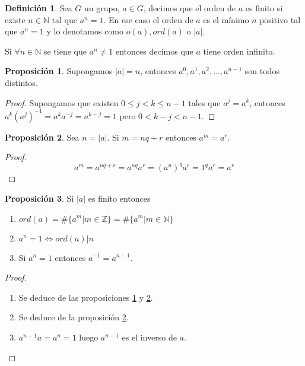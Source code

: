 \documentclass{article}
\theoremstyle{definition}
\newtheorem{defn}{Definici\'on}[subsection]
\newtheorem{prop}{Proposici\'on}[subsection]
\begin{document}
\begin{defn}
Sea $G$ un grupo, $a \in G$, decimos que el orden de $a$ es finito si existe $n \in \mathbb{N}$ tal que $a^n = 1$. En ese caso el orden de $a$ es el m\'inimo $n$ positivo tal que $a^n = 1$ y lo denotamos como $o(a), ord(a)$ o $|a|$.

Si $\forall n \in \mathbb{N}$ se tiene que $a^n \neq 1$ entonces decimos que $a$ tiene orden infinito.
\end{defn}

\begin{prop}
\label{p1}
Supongamos $|a| = n$, entonces $a^0, a^1, a^2, \dots, a^{n-1}$ son todos distintos.
\end{prop}

\begin{proof}
Supongamos que existen $0 \leq j < k \leq n-1$ tales que $a^j = a^k$, entonces $a^k (a^j)^{-1} = a^k a^{-j} = a^{k-j} = 1$ pero $0 < k-j < n-1$.
\end{proof}

\begin{prop}
\label{p2}
Sea $n = |a|$. Si $m = nq+r$ entonces $a^m = a^r$.
\end{prop}

\begin{proof}
$$a^m = a^{nq+r} = a^{nq} a^r = (a^n)^q a^r = 1^q a^r = a^r$$
\end{proof}

\begin{prop}
Si $|a|$ es finito entonces

\begin{enumerate}
\item $ord(a) = \#\{a^m | m \in \mathbb{Z}\} = \#\{a^m | m \in \mathbb{N}\}$
\item $a^n = 1 \Leftrightarrow ord(a) | n$
\item Si $a^n = 1$ entonces $a^{-1} = a^{n-1}$.
\end{enumerate}
\end{prop}

\begin{proof} $ $

\begin{enumerate}
\item Se deduce de las proposiciones \ref{p1} y \ref{p2}.
\item Se deduce de la proposici\'on \ref{p2}.
\item $a^{n-1}a = a^n = 1$ luego $a^{n-1}$ es el inverso de $a$.
\end{enumerate}
\end{proof}
\end{document}
